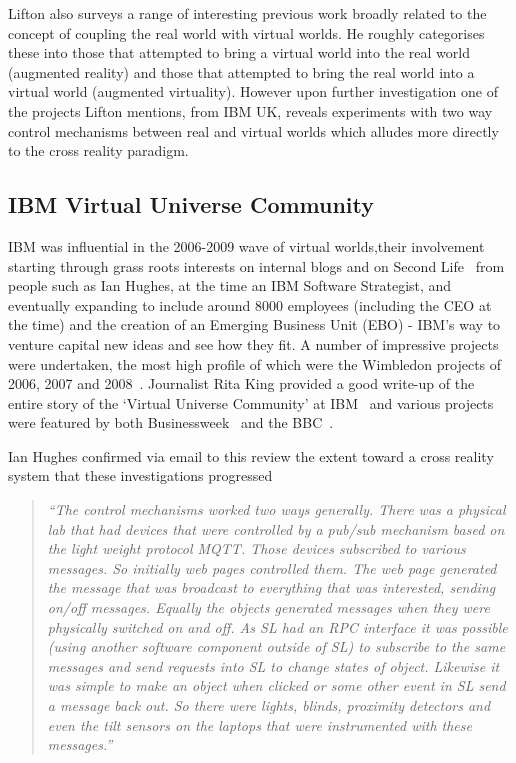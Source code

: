 Lifton also surveys a range of interesting previous work broadly related to the concept of coupling the real world with virtual worlds. He roughly categorises these into those that attempted to bring a virtual world into the real world (augmented reality) and those that attempted to bring the real world into a virtual world (augmented virtuality). However upon further investigation one of the projects Lifton mentions, from IBM UK, reveals experiments with two way control mechanisms between real and virtual worlds which alludes more directly to the cross reality paradigm.

\subsection{IBM Virtual Universe Community}
IBM was influential in the 2006-2009 wave of virtual worlds,their involvement starting through grass roots interests on internal blogs and on Second Life~\cite{Hughes2006, Hughes2006a,Hughes2006b} from people such as Ian Hughes, at the time an IBM Software Strategist, and eventually expanding to include around 8000 employees (including the CEO at the time) and the creation of an Emerging Business Unit (EBO) - IBM's way to venture capital new ideas and see how they fit. A number of impressive projects were undertaken, the most high profile of which were the Wimbledon projects of 2006, 2007 and 2008~\cite{Hughes2006c, Hughes2009}. Journalist Rita King provided a good write-up of the entire story of the `Virtual Universe Community' at IBM~\cite{King2008} and various projects were featured by both Businessweek~\cite{Life2006} and the BBC~\cite{Mason2007}.

Ian Hughes confirmed via email to this review the extent toward a cross reality system that these investigations progressed

\begin{quote}
\textit{``The control mechanisms worked two ways generally. There was a physical lab that had devices that were controlled by a pub/sub mechanism based on the light weight protocol MQTT. Those devices subscribed to various messages. So initially web pages controlled them. The web page generated the message that was broadcast to everything that was interested, sending on/off messages. Equally the objects generated messages when they were physically switched on and off. As SL had an RPC interface it was possible (using another software component outside of SL) to subscribe to the same messages and send requests into SL to change states of object. Likewise it was simple to make an object when clicked or some other event in SL send a message back out. So there were lights, blinds, proximity detectors and even the tilt sensors on the laptops that were instrumented with these messages.''}
\end{quote}

